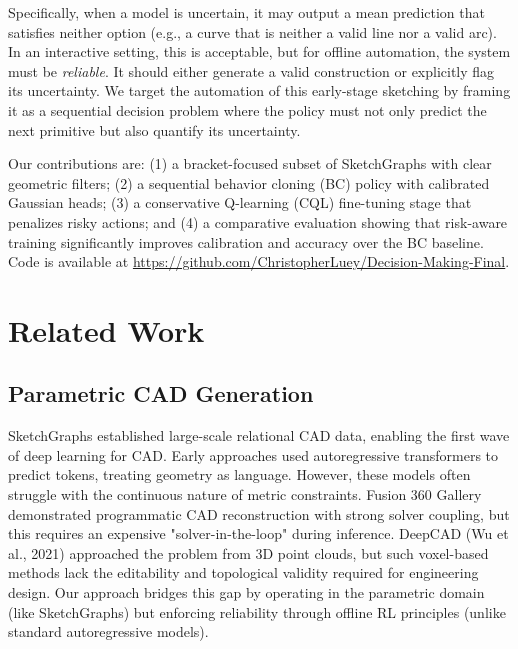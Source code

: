 \documentclass[conference]{IEEEtran}
\begin{document}
Specifically, when a model is uncertain, it may output a mean prediction that satisfies neither option (e.g., a curve that is neither a valid line nor a valid arc). In an interactive setting, this is acceptable, but for offline automation, the system must be \textit{reliable}. It should either generate a valid construction or explicitly flag its uncertainty. We target the automation of this early-stage sketching by framing it as a sequential decision problem where the policy must not only predict the next primitive but also quantify its uncertainty.

Our contributions are: (1) a bracket-focused subset of SketchGraphs with clear geometric filters; (2) a sequential behavior cloning (BC) policy with calibrated Gaussian heads; (3) a conservative Q-learning (CQL) fine-tuning stage that penalizes risky actions; and (4) a comparative evaluation showing that risk-aware training significantly improves calibration and accuracy over the BC baseline. Code is available at \url{https://github.com/ChristopherLuey/Decision-Making-Final}.

\section{Related Work}

\subsection{Parametric CAD Generation}
SketchGraphs \cite{SketchGraphs2020} established large-scale relational CAD data, enabling the first wave of deep learning for CAD. Early approaches used autoregressive transformers to predict tokens, treating geometry as language. However, these models often struggle with the continuous nature of metric constraints. Fusion 360 Gallery \cite{Willis2021Fusion360} demonstrated programmatic CAD reconstruction with strong solver coupling, but this requires an expensive "solver-in-the-loop" during inference. DeepCAD (Wu et al., 2021) approached the problem from 3D point clouds, but such voxel-based methods lack the editability and topological validity required for engineering design. Our approach bridges this gap by operating in the parametric domain (like SketchGraphs) but enforcing reliability through offline RL principles (unlike standard autoregressive models).
\end{document}
